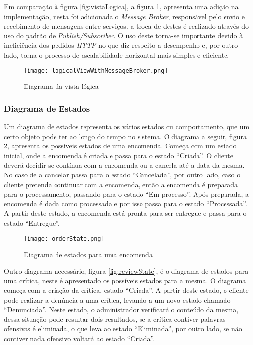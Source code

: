 Em comparação à figura \ref{fig:vistaLogica}, a figura \ref{fig:vistaLogicaBroker}, apresenta uma adição na implementação, nesta foi adicionada o \textit{Message Broker}, responsável pelo envio e recebimento de mensagens entre serviços, a troca de destes é realizado através do uso do padrão de \textit{Publish/Subscriber}. O uso deste torna-se importante devido à ineficiência dos pedidos \textit{HTTP} no que diz respeito a desempenho e, por outro lado, torna o processo de escalabilidade horizontal mais simples e eficiente. 

\begin{figure}[H]
    \centering
    \texttt{[image: logicalViewWithMessageBroker.png]}
    \caption{Diagrama da vista lógica}
    \label{fig:vistaLogicaBroker}
\end{figure}

\subsubsection{Diagrama de Estados}

Um diagrama de estados representa os vários estados ou comportamento, que um certo objeto pode ter ao longo do tempo no sistema. O diagrama a seguir, figura \ref{fig:orderState}, apresenta os possíveis estados de uma encomenda.
Começa com um estado inicial, onde a encomenda é criada e passa para o estado “Criada”. O cliente deverá decidir se contínua com a encomenda ou a cancela até a data da mesma. No caso de a cancelar passa para o estado “Cancelada”, por outro lado, caso o cliente pretenda continuar com a encomenda, então a encomenda é preparada para o processamento, passando para o estado “Em processo”. Após preparada, a encomenda é dada como processada e por isso passa para o estado “Processada”. A partir deste estado, a encomenda está pronta para ser entregue e passa para o estado “Entregue”.

\begin{figure}[H]
    \centering
    \texttt{[image: orderState.png]}
    \caption{Diagrama de estados para uma encomenda}
    \label{fig:orderState}
\end{figure}

Outro diagrama necessário, figura \ref{fig:reviewState}, é o diagrama de estados para uma crítica, neste é apresentado os possíveis estados para a mesma.
O diagrama começa com a criação da crítica, estado “Criada”. A partir deste estado, o cliente pode realizar a denúncia a uma crítica, levando a um novo estado chamado “Denunciada”. Neste estado, o administrador verificará o conteúdo da mesma, dessa situação pode resultar dois resultados, se a crítica contiver palavras ofensivas é eliminada, o que leva ao estado “Eliminada”, por outro lado, se não contiver nada ofensivo voltará ao estado “Criada”.

